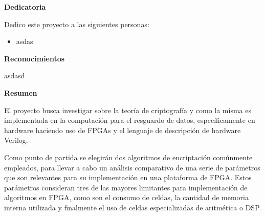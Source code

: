 \begin{center}\huge{\textbf{Dedicatoria}}\end{center}

Dedico este proyecto a las siguientes personas:
\begin{itemize} 
\item asdas
\end{itemize}

\cleardoublepage

\begin{center}\huge{\textbf{Reconocimientos}}\end{center}
asdasd
\cleardoublepage

\begin{center}\huge{\textbf{Resumen}}\end{center}


El proyecto busca investigar sobre la teoría de criptografía y como la misma es implementada en la computación para el resguardo de datos, específicamente en hardware haciendo uso de FPGAs y el lenguaje de descripción de hardware Verilog. 

Como punto de partida se elegirán dos algoritmos de encriptación comúnmente empleados, para llevar a cabo un análisis comparativo de una serie de parámetros que son relevantes para su implementación en una plataforma de FPGA. Estos parámetros consideran tres de las mayores limitantes para implementación de algoritmos en FPGA, como son el consumo de celdas, la cantidad de memoria interna utilizada y finalmente el uso de celdas especializadas de aritmética o DSP.
